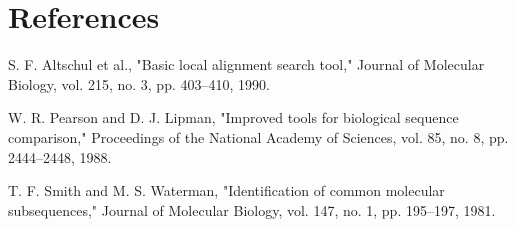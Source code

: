 \documentclass[a4paper,12pt]{article}
\begin{document}
\section{References}

\begin{thebibliography}{9}
    S. F. Altschul et al., "Basic local alignment search tool," Journal of Molecular Biology, vol. 215, no. 3, pp. 403–410, 1990.

    W. R. Pearson and D. J. Lipman, "Improved tools for biological sequence comparison," Proceedings of the National Academy of Sciences, vol. 85, no. 8, pp. 2444–2448, 1988.

    T. F. Smith and M. S. Waterman, "Identification of common molecular subsequences," Journal of Molecular Biology, vol. 147, no. 1, pp. 195–197, 1981.
\end{thebibliography}
\end{document}
